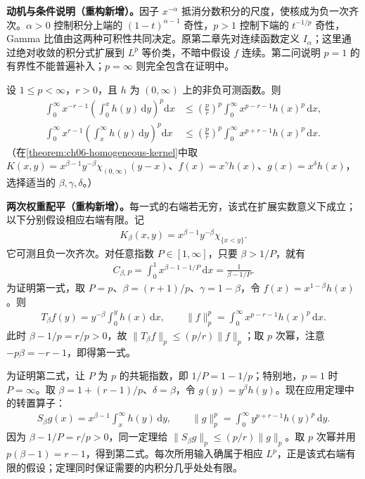 \documentclass[../../main.tex]{subfiles}
\begin{document}
\begin{remark}
\textbf{动机与条件说明（重构新增）。}因子 $x^{-\alpha}$ 抵消分数积分的尺度，使核成为负一次齐次。$\alpha>0$ 控制积分上端的 $(1-t)^{\alpha-1}$ 奇性，$p>1$ 控制下端的 $t^{-1/p}$ 奇性，Gamma 比值由这两种可积性共同决定。原第二章先对连续函数定义 $I_\alpha$；这里通过绝对收敛的积分式扩展到 $L^p$ 等价类，不暗中假设 $f$ 连续。第二问说明 $p=1$ 的有界性不能普遍补入；$p=\infty$ 则完全包含在证明中。
\end{remark}
\begin{exercise}\label{exercise:ch06-weighted-hardy}
设 $1\leqslant p<\infty$，$r>0$，且 $h$ 为 $(0,\infty)$ 上的非负可测函数。则
\begin{align*}
\int_0^\infty x^{-r-1}\left(\int_0^x h(y)\,\mathrm dy\right)^p\mathrm dx
&\leqslant\left(\frac pr\right)^p\int_0^\infty x^{p-r-1}h(x)^p\,\mathrm dx,\\
\int_0^\infty x^{r-1}\left(\int_x^\infty h(y)\,\mathrm dy\right)^p\mathrm dx
&\leqslant\left(\frac pr\right)^p\int_0^\infty x^{p+r-1}h(x)^p\,\mathrm dx.
\end{align*}
（在\cref{theorem:ch06-homogeneous-kernel}中取 $K(x,y)=x^{\beta-1}y^{-\beta}\chi_{(0,\infty)}(y-x)$、$f(x)=x^\gamma h(x)$、$g(x)=x^\delta h(x)$，选择适当的 $\beta,\gamma,\delta$。）
\end{exercise}
\begin{solution}
\textbf{两次权重配平（重构新增）。}每一式的右端若无穷，该式在扩展实数意义下成立；以下分别假设相应右端有限。记
\begin{align*}
K_\beta(x,y)=x^{\beta-1}y^{-\beta}\chi_{\{x<y\}}.
\end{align*}
它可测且负一次齐次。对任意指数 $P\in[1,\infty]$，只要 $\beta>1/P$，就有
\begin{align*}
C_{\beta,P}=\int_0^1x^{\beta-1-1/P}\,\mathrm dx=\frac1{\beta-1/P}.
\end{align*}
为证明第一式，取 $P=p$、$\beta=(r+1)/p$、$\gamma=1-\beta$，令 $f(x)=x^{1-\beta}h(x)$。则
\begin{align*}
T_\beta f(y)=y^{-\beta}\int_0^y h(x)\,\mathrm dx,\qquad
\|f\|_p^p=\int_0^\infty x^{p-r-1}h(x)^p\,\mathrm dx.
\end{align*}
此时 $\beta-1/p=r/p>0$，故 $\|T_\beta f\|_p\leqslant(p/r)\|f\|_p$；取 $p$ 次幂，注意 $-p\beta=-r-1$，即得第一式。

为证明第二式，让 $P$ 为 $p$ 的共轭指数，即 $1/P=1-1/p$；特别地，$p=1$ 时 $P=\infty$。取 $\beta=1+(r-1)/p$、$\delta=\beta$，令 $g(y)=y^\beta h(y)$。现在应用定理中的转置算子：
\begin{align*}
S_\beta g(x)=x^{\beta-1}\int_x^\infty h(y)\,\mathrm dy,\qquad
\|g\|_p^p=\int_0^\infty y^{p+r-1}h(y)^p\,\mathrm dy.
\end{align*}
因为 $\beta-1/P=r/p>0$，同一定理给 $\|S_\beta g\|_p\leqslant(p/r)\|g\|_p$。取 $p$ 次幂并用 $p(\beta-1)=r-1$，得到第二式。每次所用输入确属于相应 $L^p$，正是该式右端有限的假设；定理同时保证需要的内积分几乎处处有限。
\end{solution}
\end{document}
